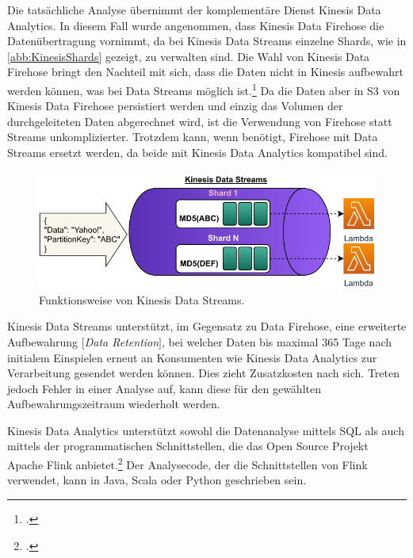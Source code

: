 Die tatsächliche Analyse übernimmt der komplementäre Dienst Kinesis Data Analytics. 
In diesem Fall wurde angenommen, dass Kinesis Data Firehose die Datenübertragung vornimmt, da bei Kinesis Data Streams einzelne Shards, wie in \autoref{abb:KinesisShards} gezeigt, zu verwalten sind. Die Wahl von Kinesis Data Firehose bringt den Nachteil mit sich, dass die Daten nicht in Kinesis aufbewahrt werden können, was bei Data Streams möglich ist.\footcite[Vgl.][]{AmazonWebServicesInc..o.J.bh} Da die Daten aber in \ac{S3} von Kinesis Data Firehose persistiert werden und einzig das Volumen der durchgeleiteten Daten abgerechnet wird, ist die Verwendung von Firehose statt Streams unkomplizierter. Trotzdem kann, wenn benötigt, Firehose mit Data Streams ersetzt werden, da beide mit Kinesis Data Analytics kompatibel sind.

\begin{figure}[H]
\centering
\includegraphics[width=\textwidth]{graphics/kinesis-inner-workings.pdf}
\caption[Funktionsweise von Kinesis Data Streams]{Funktionsweise von Kinesis Data Streams.\footnotemark}
\label{abb:KinesisShards}
\end{figure}

Kinesis Data Streams unterstützt, im Gegensatz zu Data Firehose, eine erweiterte Aufbewahrung $\lbrack$\textit{Data Retention}$\rbrack$, bei welcher Daten bis maximal 365 Tage nach initialem Einspielen erneut an Konsumenten wie Kinesis Data Analytics zur Verarbeitung gesendet werden können. Dies zieht Zusatzkosten nach sich. Treten jedoch Fehler in einer Analyse auf, kann diese für den gewählten Aufbewahrungszeitraum wiederholt werden.

Kinesis Data Analytics unterstützt sowohl die Datenanalyse mittels \ac{SQL} als auch mittels der programmatischen Schnittstellen, die das Open Source Projekt Apache Flink anbietet.\footcite[Vgl.][]{AmazonWebServicesInc..2020f} Der Analysecode, der die Schnittstellen von Flink verwendet, kann in Java, Scala oder Python geschrieben sein.

